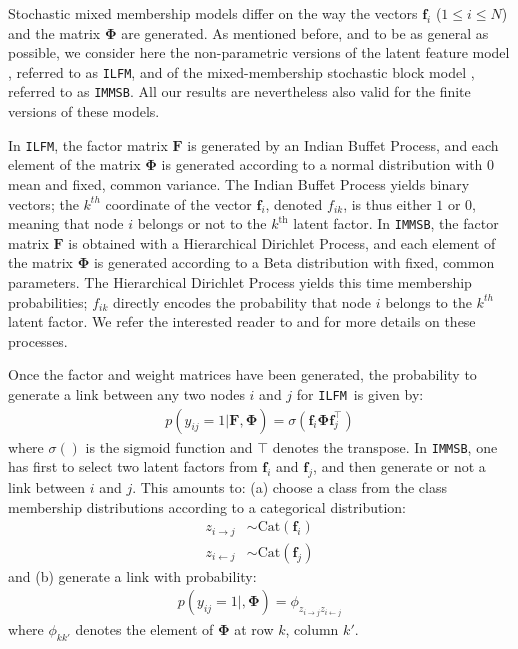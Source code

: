 \documentclass[9pt,twocolumn,twoside]{pnas-new}
\newcommand{\ifm}{\texttt{ILFM}}
\newcommand{\imb}{\texttt{IMMSB}}
\newcommand{\mat}[1]{\mathbf{#1}}
\begin{document}
Stochastic mixed membership models differ on the way the vectors $\mat{f}_{i}$ ($1 \le i \le N$) and the matrix $\mat{\Phi}$ are generated. As mentioned before, and to be as general as possible, we consider here the non-parametric versions of the latent feature model \cite{ILFRM}, referred to as \ifm, and of the mixed-membership stochastic block model \cite{iMMSB,diMMSB}, referred to as \imb. All our results are nevertheless also valid for the finite versions of these models.

In \ifm, the factor matrix $\mat{F}$ is generated by an Indian Buffet Process, and each element of the matrix $\mat{\Phi}$ is generated according to a normal distribution with 0 mean and fixed, common variance. The Indian Buffet Process yields binary vectors; the $k^{th}$ coordinate of the vector $\mat{f}_{i}$, denoted $f_{ik}$, is thus either $1$ or $0$, meaning that node $i$ belongs or not to the $k^{\mbox{th}}$ latent factor. In \imb, the factor matrix $\mat{F}$ is obtained with a Hierarchical  Dirichlet Process, and each element of the matrix $\mat{\Phi}$ is generated according to a Beta distribution with fixed, common parameters. The Hierarchical  Dirichlet Process yields this time membership probabilities; $f_{ik}$ directly encodes the probability that node $i$ belongs to the $k^{th}$ latent factor. We refer the interested reader to \cite{ILFRM} and \cite{iMMSB} for more details on these processes.

Once the factor and weight matrices have been generated, the probability to generate a link between any two nodes $i$ and $j$ for \ifm\ is given by:
%
\begin{align}
p(y_{ij}=1|\mat{F},\mat{\Phi}) = \sigma(\mat{f}_{i} \mat{\Phi} \mat{f}_{j}^\top)
\label{eq:ilfm}
\end{align}
%
where $\sigma()$ is the sigmoid function and $\top$ denotes the transpose. In \imb, one has first to select two latent factors from $\mat{f}_i$ and $\mat{f}_j$, and then generate or not a link between $i$ and $j$. This amounts to: (a) choose a class from the class membership distributions according to a categorical distribution:
%
\begin{align}
 z_{i \rightarrow j} &\sim \mbox{Cat}(\mat{f}_i) \nonumber \\
 z_{i \leftarrow j} &\sim \mbox{Cat}(\mat{f}_j) \nonumber
\end{align} 
%
and (b) generate a link with probability:
%
\begin{align}
 p(y_{ij}=1|,\mat{\Phi}) = \phi_{z_{i \rightarrow j}z_{i \leftarrow j}}
\label{eq:immsb}
\end{align}
%
where $\phi_{kk'}$ denotes the element of $\mat{\Phi}$ at row $k$, column $k'$.
\end{document}
